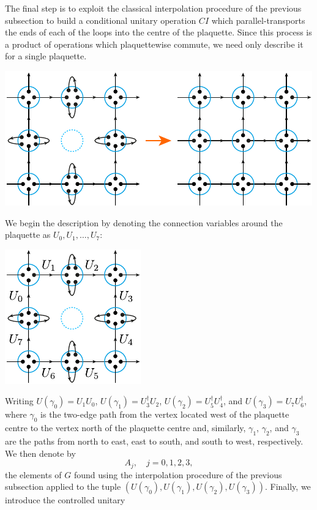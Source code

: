 \documentclass[twocolumn,lengthcheck,superscriptaddress]{revtex4-1}
\theoremstyle{definition}
\theoremstyle{remark}
\begin{document}
The final step is to exploit the classical interpolation procedure of the previous subsection to build a conditional unitary operation $CI$ which parallel-transports the ends of each of the loops into the centre of the plaquette. Since this process is a product of operations which plaquettewise commute, we need only describe it for a single plaquette. 
\begin{center}
	\includegraphics{qinterp3.pdf}
\end{center} 
We begin the description by denoting the connection variables around the plaquette as $U_0, U_1, \ldots, U_7$:
\begin{center}
	\includegraphics{qinterp4.pdf}
\end{center} 
Writing $U(\gamma_0)=U_1U_0$, $U(\gamma_1)=U_3^\dag U_2$, $U(\gamma_2)=U_5^\dag U_4^\dag$, and $U(\gamma_3)=U_7 U_6^\dag$, where $\gamma_0$ is the two-edge path from the vertex located west of the plaquette centre to the vertex north of the plaquette centre and, similarly, $\gamma_1$, $\gamma_2$, and $\gamma_3$ are the paths from north to east, east to south, and south to west, respectively. We then denote by 
\begin{equation}
	A_j, \quad j = 0, 1, 2, 3,
\end{equation}
the elements of $G$ found using the interpolation procedure of the previous subsection applied to the tuple $(U(\gamma_0), U(\gamma_1), U(\gamma_2), U(\gamma_3))$. Finally, we introduce the controlled unitary 
\end{document}
